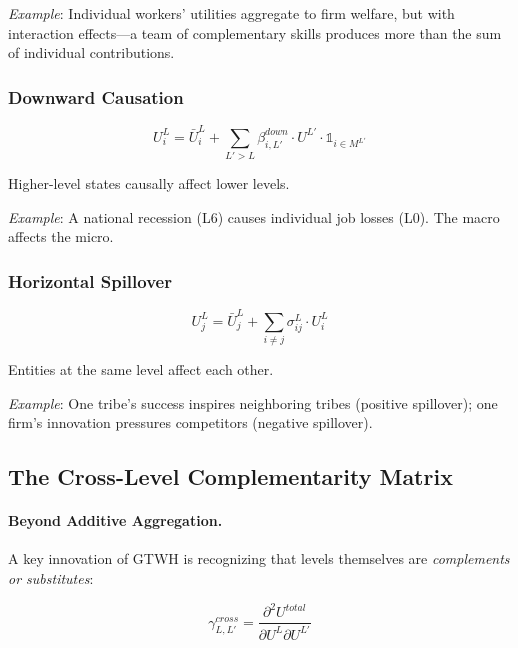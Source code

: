 \textit{Example}: Individual workers' utilities aggregate to firm welfare, 
but with interaction effects---a team of complementary skills produces more 
than the sum of individual contributions.

\subsubsection{Downward Causation}

\begin{equation}
U^L_i = \bar{U}^L_i + \sum_{L' > L} \beta^{down}_{i,L'} \cdot U^{L'} \cdot \mathbb{1}_{i \in M^{L'}}
\end{equation}

Higher-level states causally affect lower levels.

\textit{Example}: A national recession (L6) causes individual job losses (L0). 
The macro affects the micro.

\subsubsection{Horizontal Spillover}

\begin{equation}
U^L_j = \bar{U}^L_j + \sum_{i \neq j} \sigma^L_{ij} \cdot U^L_i
\end{equation}

Entities at the same level affect each other.

\textit{Example}: One tribe's success inspires neighboring tribes (positive spillover); 
one firm's innovation pressures competitors (negative spillover).

\subsection{The Cross-Level Complementarity Matrix}

\paragraph{Beyond Additive Aggregation.}
A key innovation of GTWH is recognizing that levels themselves are 
\textit{complements or substitutes}:

\begin{equation}
\gamma^{cross}_{L,L'} = \frac{\partial^2 U^{total}}{\partial U^L \partial U^{L'}}
\end{equation}

